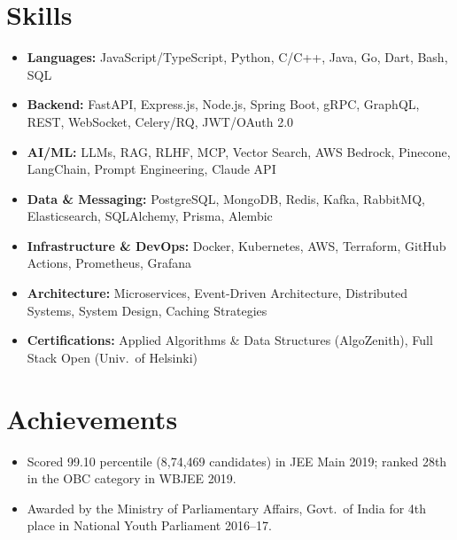 \documentclass[11pt]{article}
\begin{document}
\section{Skills}
\begin{itemize}[leftmargin=0pt,label={}]
  \item \textbf{Languages:} JavaScript/TypeScript, Python, C/C++, Java, Go, Dart, Bash, SQL
  \item \textbf{Backend:} FastAPI, Express.js, Node.js, Spring Boot, gRPC, GraphQL, REST, WebSocket, Celery/RQ, JWT/OAuth 2.0
  \item \textbf{AI/ML:} LLMs, RAG, RLHF, MCP, Vector Search, AWS Bedrock, Pinecone, LangChain, Prompt Engineering, Claude API
  \item \textbf{Data \& Messaging:} PostgreSQL, MongoDB, Redis, Kafka, RabbitMQ, Elasticsearch, SQLAlchemy, Prisma, Alembic
  \item \textbf{Infrastructure \& DevOps:} Docker, Kubernetes, AWS, Terraform, GitHub Actions, Prometheus, Grafana
  \item \textbf{Architecture:} Microservices, Event-Driven Architecture, Distributed Systems, System Design, Caching Strategies
  \item \textbf{Certifications:} Applied Algorithms \& Data Structures (AlgoZenith), Full Stack Open (Univ.\ of Helsinki)
\end{itemize}

\section{Achievements}
\begin{itemize}
  \item Scored 99.10 percentile (8,74,469 candidates) in JEE Main 2019; ranked 28th in the OBC category in WBJEE 2019.
  \item Awarded by the Ministry of Parliamentary Affairs, Govt.\ of India for 4th place in National Youth Parliament 2016--17.
\end{itemize}
\end{document}
